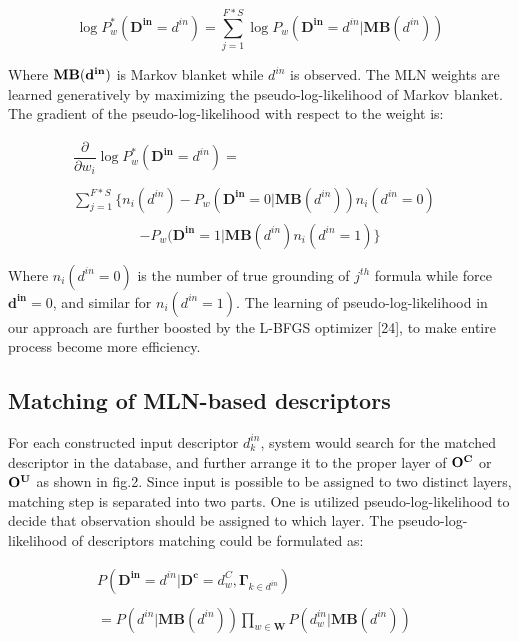 \documentclass[journal]{IEEEtran}
\begin{document}
\begin{equation}
\log P^*_w(\mathbf{D^{in}} = d^{in}) = \sum_{j=1}^{F*S} \log P_{w}(\mathbf{D^{in}} = d^{in}|\mathbf{MB}(d^{in}))
\end{equation}

Where $\bf{MB}(d^{in})$ is Markov blanket while $d^{in}$ is observed. The MLN weights are learned generatively by maximizing the pseudo-log-likelihood of Markov blanket. The gradient of the pseudo-log-likelihood with respect to the weight is:

\begin{displaymath}
\begin{array}{ll}
\dfrac{\partial}{\partial w_i}\log P^*_w(\mathbf{D^{in}} = d^{in})= &\\\\
\sum^{F*S}_{j=1}\{n_i(d^{in})-P_w(\mathbf{D^{in}}=0|\mathbf{MB}(d^{in}))n_i(d^{in}=0) &\\
\end{array}
\end{displaymath}
\begin{equation}
-P_w(\mathbf{D^{in}}=1|\mathbf{MB}(d^{in})n_i(d^{in}=1)\}
\end{equation}

Where $n_i(d^{in}=0)$ is the number of true grounding of $j^{th}$ formula while force $\mathbf{d^{in}}=0$, and similar for $n_i(d^{in}=1)$. The learning of pseudo-log-likelihood in our approach are further boosted by the L-BFGS optimizer [24], to make entire process become more efficiency.



\subsection{Matching of MLN-based descriptors}
For each constructed input descriptor $d^{in}_k$, system would search for the matched descriptor in the database, and further arrange it to the proper layer of $\bf{O^C}$ or $\bf{O^U}$ as shown in fig.2. Since input is possible to be assigned to two distinct layers, matching step is separated into two parts. One is utilized pseudo-log-likelihood to decide that observation should be assigned to which layer. The pseudo-log-likelihood of descriptors matching could be formulated as:


\begin{equation}
\begin{array}{ll}

P( \mathbf{D^{in}} = d^{in}| \mathbf{ D^c} = d^C_w , \mathbf{\Gamma}_{k \in {d^{in}}}) &\\\\
= P(d^{in} | \mathbf{MB}(d^{in})) \prod_{w\in{\mathbf W}}{P(d^{in}_w | \mathbf{MB}(d^{in}))}
\end{array}
\end{equation}
\end{document}
